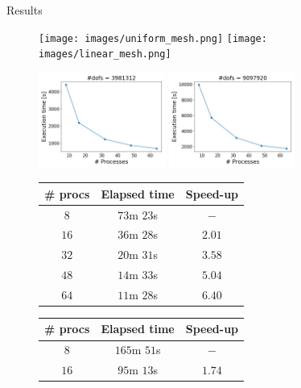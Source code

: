 \documentclass[final]{beamer}
\newlength{\onecolwid}
\begin{document}
\begin{frame}[t]
\begin{columns}[t]
\begin{column}{\onecolwid}
\begin{block}{Results}
\vspace*{.2em}
\begin{figure}
  \begin{center}
    \texttt{[image: images/uniform\_mesh.png]}
    \hspace{1em}
    \texttt{[image: images/linear\_mesh.png]}
  \end{center}
  \begin{center}
    \includegraphics[width=0.37\textwidth]{images/uniform_scaling.png}
    \hspace{1em}
    \includegraphics[width=0.37\textwidth]{images/linear_scaling.png}
  \end{center}
  \begin{center}
    \footnotesize
    \hspace{.5em}
    \begin{tabular}{ccc}
      \toprule
      \# procs & Elapsed time & Speed-up\\
      \midrule
      $8$  & $73$m $23$s & $-$   \\
      $16$ & $36$m $28$s & $2.01$\\
      $32$ & $20$m $31$s & $3.58$\\
      $48$ & $14$m $33$s & $5.04$\\
      $64$ & $11$m $28$s & $6.40$\\
      \bottomrule
    \end{tabular}
    \hspace{4.5em}
    \begin{tabular}{ccc}
      \toprule
      \# procs & Elapsed time & Speed-up\\
      \midrule
      $8$  &              $165$m $51$s & $-$   \\
      $16$ & \hspace{0.5em}$95$m $13$s & $1.74$\\

\end{tabular}
\end{center}
\end{figure}
\end{block}
\end{column}
\end{columns}
\end{frame}
\end{document}
